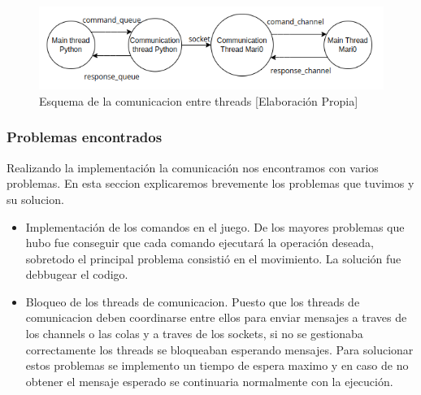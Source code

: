 \begin{figure}[ht]
    \centering
    \includegraphics[width=1.0\textwidth]{img/threads.png}
    \caption{Esquema de la comunicacion entre threads [Elaboración Propia]}
    \label{fig:threads}
\end{figure}

\subsubsection*{Problemas encontrados}

Realizando la implementación la comunicación nos encontramos con varios problemas. En esta seccion explicaremos brevemente los problemas que tuvimos y su solucion.

\begin{itemize}
    \item Implementación de los comandos en el juego. De los mayores problemas que hubo fue conseguir que cada comando ejecutará la operación deseada, sobretodo el principal problema consistió en el movimiento. La solución fue debbugear el codigo.
    \item Bloqueo de los threads de comunicacion. Puesto que los threads de comunicacion deben coordinarse entre ellos para enviar mensajes a traves de los channels o las colas y a traves de los sockets, si no se gestionaba correctamente los threads se bloqueaban esperando mensajes. Para solucionar estos problemas se implemento un tiempo de espera maximo y en caso de no obtener el mensaje esperado se continuaria normalmente con la ejecución.
\end{itemize}